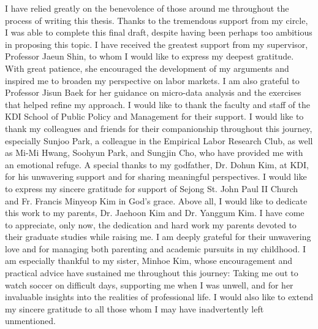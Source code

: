 \documentclass[
  12pt,
]{article}
\begin{document}
\begin{spacing}{2.0}

I have relied greatly on the benevolence of those around me throughout the process of writing this thesis. Thanks to the tremendous support from my circle, I was able to complete this final draft, despite having been perhaps too ambitious in proposing this topic. I have received the greatest support from my supervisor, Professor Jaeun Shin, to whom I would like to express my deepest gratitude. With great patience, she encouraged the development of my arguments and inspired me to broaden my perspective on labor markets. I am also grateful to Professor Jisun Baek for her guidance on micro-data analysis and the exercises that helped refine my approach. I would like to thank the faculty and staff of the KDI School of Public Policy and Management for their support. I would like to thank my colleagues and friends for their companionship throughout this journey, especially Sunjoo Park, a colleague in the Empirical Labor Research Club, as well as Mi-Mi Hwang, Soohyun Park, and Sungjin Cho, who have provided me with an emotional refuge. A special thanks to my godfather, Dr. Dohun Kim, at KDI, for his unwavering support and for sharing meaningful perspectives. I would like to express my sincere gratitude for support of Sejong St. John Paul II Church and Fr. Francis Minyeop Kim in God's grace. Above all, I would like to dedicate this work to my parents, Dr. Jaehoon Kim and Dr. Yanggum Kim. I have come to appreciate, only now, the dedication and hard work my parents devoted to their graduate studies while raising me. I am deeply grateful for their unwavering love and for managing both parenting and academic pursuits in my childhood. I am especially thankful to my sister, Minhoe Kim, whose encouragement and practical advice have sustained me throughout this journey: Taking me out to watch soccer on difficult days, supporting me when I was unwell, and for her invaluable insights into the realities of professional life. I would also like to extend my sincere gratitude to all those whom I may have inadvertently left unmentioned.

\end{spacing}

\newpage
{}
\end{document}
